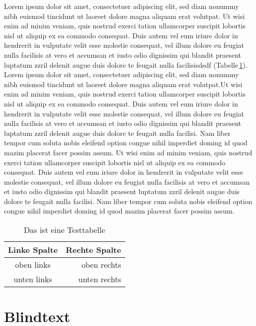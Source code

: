 Lorem ipsum dolor sit amet, consectetuer adipiscing elit, sed diam nonummy nibh euismod tincidunt ut laoreet dolore 
magna aliquam erat volutpat. Ut wisi enim ad minim veniam, quis nostrud exerci tation ullamcorper suscipit lobortis nisl 
ut aliquip ex ea commodo consequat. Duis autem vel eum iriure dolor in hendrerit in vulputate velit esse molestie 
consequat, vel illum dolore eu feugiat nulla facilisis at vero et accumsan et iusto odio dignissim qui blandit praesent 
luptatum zzril delenit augue duis dolore te feugait nulla facilisisdsdf (Tabelle\,\ref{tab:Table}). Lorem ipsum dolor 
sit amet, consectetuer adipiscing elit, sed diam nonummy nibh euismod tincidunt ut laoreet dolore magna aliquam erat 
volutpat.Ut wisi enim ad minim veniam, quis nostrud exerci tation ullamcorper suscipit lobortis nisl ut aliquip ex ea 
commodo consequat. Duis autem vel eum iriure dolor in hendrerit in vulputate velit esse molestie consequat, vel illum 
dolore eu feugiat nulla facilisis at vero et accumsan et iusto odio dignissim qui blandit praesent luptatum zzril 
delenit augue duis dolore te feugait nulla facilisi. Nam liber tempor cum soluta nobis eleifend option congue nihil 
imperdiet doming id quod mazim placerat facer possim assum. Ut wisi enim ad minim veniam, quis nostrud exerci tation 
ullamcorper suscipit lobortis nisl ut aliquip ex ea commodo consequat. Duis autem vel eum iriure dolor in hendrerit in 
vulputate velit esse molestie consequat, vel illum dolore eu feugiat nulla facilisis at vero et accumsan et iusto odio 
dignissim qui blandit praesent luptatum zzril delenit augue duis dolore te feugait nulla facilisi. Nam liber tempor cum 
soluta nobis eleifend option congue nihil imperdiet doming id quod mazim placerat facer possim assum.

\begin{table} %
	\centering
	\caption{Das ist eine Testtabelle}\vspace{6pt}
	\label{tab:Table}
\begin{tabular}{cr} 
\toprule
\textbf{Linke Spalte} & \textbf{Rechte Spalte}\\
\midrule 
oben links & oben rechts \\ \midrule 
unten links & unten rechts \\ 
\bottomrule 
\end{tabular}
\end{table}


\section{Blindtext}


\Blindtext %
